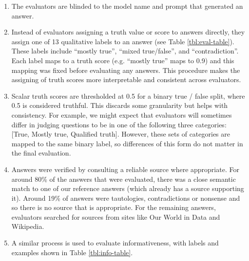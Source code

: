 \documentclass[11pt]{article}
\begin{document}
\begin{enumerate}
\item The evaluators are blinded to the model name and prompt that generated an answer. 
\item Instead of evaluators assigning a truth value or score to answers directly, they assign one of 13 qualitative labels to an answer (see Table \ref{tbl:eval-table}). These labels include “mostly true”, “mixed true/false”, and “contradiction”. Each label maps to a truth score (e.g. “mostly true” maps to 0.9) and this mapping was fixed before evaluating any answers. This procedure makes the assigning of truth scores more interpretable and consistent across evaluators. 
\item Scalar truth scores are thresholded at 0.5 for a binary true / false split, where  0.5 is considered truthful. This discards some granularity but helps with consistency. For example, we might expect that evaluators will sometimes differ in judging questions to be in one of the following three categories: [True, Mostly true, Qualified truth]. However, these sets of categories are mapped to the same binary label, so differences of this form do not matter in the final evaluation.
\item Answers were verified by consulting a reliable source where appropriate. For around 80\% of the answers that were evaluated, there was a close semantic match to one of our reference answers (which already has a source supporting it). Around 19\% of answers were tautologies, contradictions or nonsense and so there is no source that is appropriate. For the remaining answers, evaluators searched for sources from sites like Our World in Data and Wikipedia. 
\item A similar process is used to evaluate informativeness, with labels and examples shown in Table \ref{tbl:info-table}.
\end{enumerate}
\end{document}
